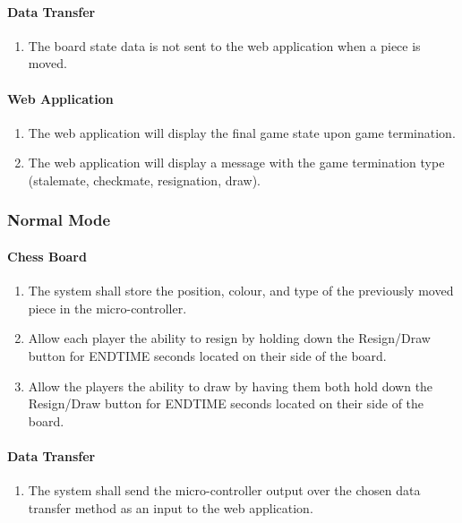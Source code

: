 \documentclass[12pt]{article}
\begin{document}
\paragraph{Data Transfer}
\begin{enumerate}[{GI}1., leftmargin=2\parindent, resume]
    \item The board state data is not sent to the web application when a piece is moved.
\end{enumerate}

\paragraph{Web Application}
\begin{enumerate}[{GI}1., leftmargin=2\parindent, resume]
    \item The web application will display the final game state upon game termination.
    \item The web application will display a message with the game termination type (stalemate, checkmate, resignation, draw).
\end{enumerate}

\subsubsection{Normal Mode}
\paragraph{Chess Board}
\begin{enumerate}[{NB}1., leftmargin=2\parindent]
    \item The system shall store the position, colour, and type of the previously moved piece in the micro-controller.
    \item Allow each player the ability to resign by holding down the Resign/Draw button for ENDTIME seconds located on their side of the board.
    \item Allow the players the ability to draw by having them both hold down the Resign/Draw button for ENDTIME seconds located on their side of the board. 
\end{enumerate}

\paragraph{Data Transfer}
\begin{enumerate}[{ND}1., leftmargin=2\parindent]
    \item The system shall send the micro-controller output over the chosen data transfer method as an input to the web application.
\end{enumerate}
\end{document}
